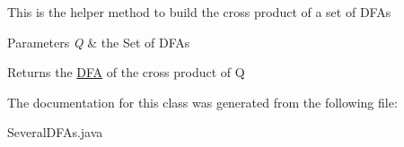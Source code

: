 This is the helper method to build the cross product of a set of D\+F\+As 
\begin{DoxyParams}{Parameters}
{\em Q} & the Set of D\+F\+As \\
\hline
\end{DoxyParams}
\begin{DoxyReturn}{Returns}
the \mbox{\hyperlink{class_d_f_a}{D\+FA}} of the cross product of Q 
\end{DoxyReturn}


The documentation for this class was generated from the following file\+:\begin{DoxyCompactItemize}
\item 
Several\+D\+F\+As.\+java\end{DoxyCompactItemize}

